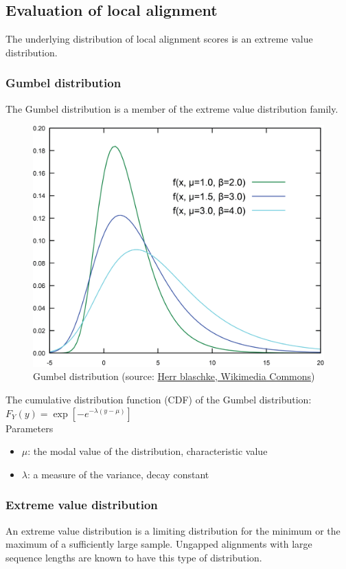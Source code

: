 %
%

%
%
\subsection{Evaluation of local alignment}
The underlying distribution of local alignment scores is an extreme value distribution.

%
%
\subsubsection*{Gumbel distribution} 
The Gumbel distribution is a member of the extreme value distribution family. \\

\begin{figure}[H]
  \centering
      \includegraphics[width=0.4 \textwidth]{fig06/gumbel.png}
  \caption{Gumbel distribution (source: \href{https://commons.wikimedia.org/w/index.php?curid=4787663}{Herr blaschke, Wikimedia Commons})}
\end{figure}

\noindent
The cumulative distribution function (CDF) of the Gumbel distribution: \\

$F_Y(y) = \exp [-e^{-\lambda(y-\mu)}]$ \\

\noindent
Parameters
\begin{itemize}
\item $\mu$: the modal value of the distribution, characteristic value
\item $\lambda$: a measure of the variance, decay constant
\end{itemize}

%
%
\subsubsection*{Extreme value distribution}
An extreme value distribution is a limiting distribution for the minimum or the maximum of a sufficiently large sample. Ungapped alignments with large sequence lengths are known to have this type of distribution. \\

